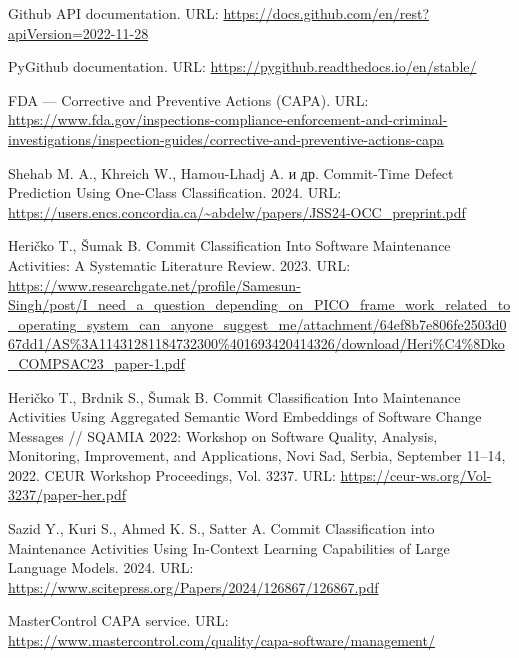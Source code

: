 \begin{thebibliography}{99}
	\label{GithubAPI}
	Github API documentation.  
	URL: \url{https://docs.github.com/en/rest?apiVersion=2022-11-28}
	
	\label{PyGithub}
	PyGithub documentation.  
	URL: \url{https://pygithub.readthedocs.io/en/stable/}
	
	\label{FDA}
	FDA — Corrective and Preventive Actions (CAPA).  
	URL: \url{https://www.fda.gov/inspections-compliance-enforcement-and-criminal-investigations/inspection-guides/corrective-and-preventive-actions-capa}
	
	\label{One-Class}
	Shehab M. A., Khreich W., Hamou-Lhadj A. и др.  
	Commit-Time Defect Prediction Using One-Class Classification. 2024.  
	URL: \url{https://users.encs.concordia.ca/~abdelw/papers/JSS24-OCC_preprint.pdf}
	
	\label{Commit-classification}
	Heričko T., Šumak B.  
	Commit Classification Into Software Maintenance Activities: A Systematic Literature Review. 2023.  
	URL: \url{https://www.researchgate.net/profile/Samesun-Singh/post/I_need_a_question_depending_on_PICO_frame_work_related_to_operating_system_can_anyone_suggest_me/attachment/64ef8b7e806fe2503d067dd1/AS%3A11431281184732300%401693420414326/download/Heri%C4%8Dko_COMPSAC23_paper-1.pdf}
	
	\label{Hericko}
	Heričko T., Brdnik S., Šumak B. Commit Classification Into Maintenance Activities Using Aggregated Semantic Word Embeddings of Software Change Messages // SQAMIA 2022: Workshop on Software Quality, Analysis, Monitoring, Improvement, and Applications, Novi Sad, Serbia, September 11–14, 2022. CEUR Workshop Proceedings, Vol. 3237. URL: \url{https://ceur-ws.org/Vol-3237/paper-her.pdf}
	
	\label{Sazid}
	Sazid Y., Kuri S., Ahmed K. S., Satter A.  
	Commit Classification into Maintenance Activities Using In-Context Learning Capabilities of Large Language Models. 2024.  
	URL: \url{https://www.scitepress.org/Papers/2024/126867/126867.pdf}
	
	\label{MasterControl}
	MasterControl CAPA service. URL: \url{https://www.mastercontrol.com/quality/capa-software/management/}
	
\end{thebibliography}
